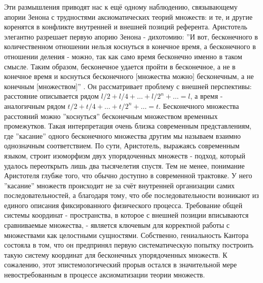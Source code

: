 \documentclass[12pt]{article}
\begin{document}
Эти размышления приводят нас к ещё одному наблюдению, связывающему апории Зенона с трудностями аксиоматических теорий множеств: и те, и другие коренятся в конфликте внутренней и внешней позиций референта. Аристотель элегантно разрешает первую апорию Зенона - дихотомию: ''И вот, бесконечного в количественном отношении нельзя коснуться в конечное время, а бесконечного в отношении деления - можно, так как само время бесконечно именно в таком смысле. Таким образом, бесконечное удается пройти в бесконечное, а не в конечное время и коснуться бесконечного [множества можно] бесконечным, а не конечным [множеством]'' \cite{aristotle-dichotomy}. Он рассматривает проблему с внешней перспективы: расстояние описывается рядом $l/2 + l/4 + \dots + l/2^n + \dots = l$, а время - аналогичным рядом $t/2 + t/4 + \dots + t/2^n + \dots = t$. Бесконечного множества расстояний можно ''коснуться'' бесконечным множеством временных промежутков. Такая интерпретация очень близка современным представлениям, где ''касание'' одного бесконечного множества другим мы называем взаимно однозначным соответствием. По сути, Аристотель, выражаясь современным языком, строит изоморфизм двух упорядоченных множеств - подход, который удалось переоткрыть лишь два тысячелетия спустя. Тем не менее, понимание Аристотеля глубже того, что обычно доступно в современной трактовке. У него ''касание'' множеств происходит не за счёт внутренней организации самих последовательностей, а благодаря тому, что обе последовательности возникают из единого описания фиксированного физического процесса. Требование общей системы координат - пространства, в которое с внешней позиции вписываются сравниваемые множества, - является ключевым для корректной работы с множествами как целостными сущностями. Собственно, гениальность Кантора состояла в том, что он предпринял первую систематическую попытку построить такую систему координат для бесконечных упорядоченных множеств. К сожалению, этот эпистемологический прорыв остался в значительной мере невостребованным в процессе аксиоматизации теории множеств.
\end{document}

